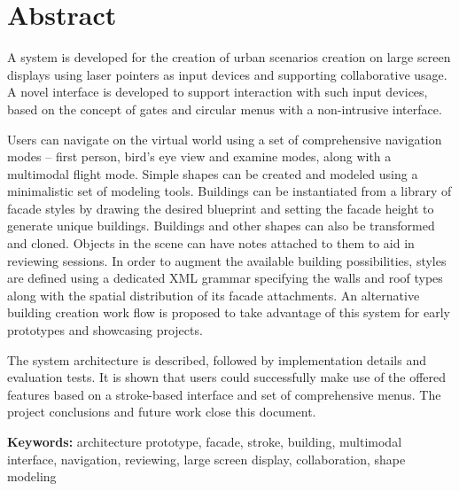 \chapter*{Abstract}





A system is developed for the creation of urban scenarios creation on large screen displays
using laser pointers as input devices and supporting collaborative usage.
A novel interface is developed to support interaction with such input devices,
based on the concept of gates and circular menus with a non-intrusive interface.



Users can navigate on the virtual world using a set of comprehensive navigation modes
-- first person, bird's eye view and examine modes, along with a multimodal flight mode.
Simple shapes can be created and modeled using a minimalistic set of modeling tools.
Buildings can be instantiated from a library of facade styles by drawing
the desired blueprint and setting the facade height to generate unique buildings.
Buildings and other shapes can also be transformed and cloned.
Objects in the scene can have notes attached to them to aid in reviewing sessions.
In order to augment the available building possibilities, styles are defined using a dedicated XML grammar
specifying the walls and roof types along with the spatial distribution of its facade attachments.
An alternative building creation work flow is proposed to take advantage of this system for early prototypes
and showcasing projects.

The system architecture is described, followed by implementation details and evaluation tests.
It is shown that users could successfully make use of the offered features based on a stroke-based
interface and set of comprehensive menus. 
The project conclusions and future work close this document.







\textbf{Keywords:} architecture prototype, facade, stroke, building, multimodal interface, navigation, reviewing, large screen display, collaboration, shape modeling

